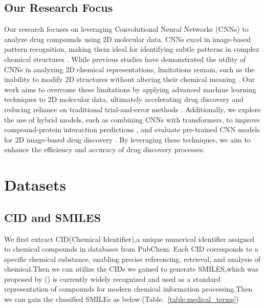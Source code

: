 \documentclass{mcmthesis}
\begin{document}
\subsection{Our Research Focus}

Our research focuses on leveraging Convolutional Neural Networks (CNNs) to analyze drug compounds using 2D molecular data. CNNs excel in image-based pattern recognition, making them ideal for identifying subtle patterns in complex chemical structures \cite{krizhevsky2012imagenet}. While previous studies have demonstrated the utility of CNNs in analyzing 2D chemical representations, limitations remain, such as the inability to modify 2D structures without altering their chemical meaning \cite{hirohara2018convolutional}. Our work aims to overcome these limitations by applying advanced machine learning techniques to 2D molecular data, ultimately accelerating drug discovery and reducing reliance on traditional trial-and-error methods \cite{park2022brief}. Additionally, we explore the use of hybrid models, such as combining CNNs with transformers, to improve compound-protein interaction predictions \cite{qian2022cat}, and evaluate pre-trained CNN models for 2D image-based drug discovery \cite{banegas2024evaluation}. By leveraging these techniques, we aim to enhance the efficiency and accuracy of drug discovery processes.
\section{Datasets}
\subsection{CID and SMILES}
We first extract CID(Chemical Identifier),a unique numerical identifier assigned to chemical compounds in databases from PubChem. Each CID corresponds to a specific chemical substance, enabling precise referencing, retrieval, and analysis of chemical.Then we can utilize the CIDs we gained to generate SMILES,which was proposed by (\cite{weininger1988smiles}) is currently widely recognized and used as a standard representation of compounds for modern chemical information processing.Then we can gain the classified SMILEs as below.(Table.~\ref{table:medical_terms})
\end{document}
